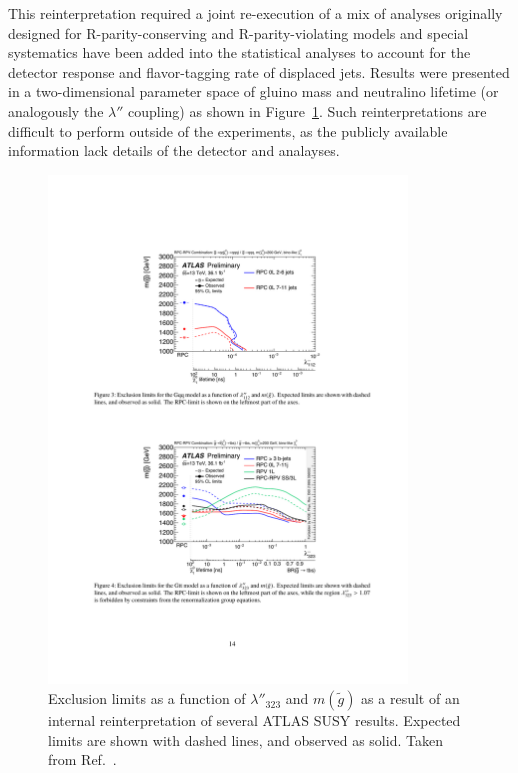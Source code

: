 This reinterpretation required a joint re-execution of a mix of analyses originally designed for R-parity-conserving and R-parity-violating models and special systematics have been added into the statistical analyses to account for the detector response and flavor-tagging rate of displaced jets. Results were presented in a two-dimensional parameter space of gluino mass and neutralino lifetime (or analogously the $\lambda''$ coupling) as shown in Figure~\ref{fig:rpvrpc}. Such reinterpretations are difficult to perform outside of the experiments, as the publicly available information lack details of the detector and analayses.

\begin{figure}[h]
\begin{center}
\includegraphics[width=0.85\textwidth,angle=0]{ch5-figures/fig_04.pdf}
\end{center}
\caption{Exclusion limits as a function of $\lambda''_{323}$ and $m({\tilde{g}})$ as a result of an internal reinterpretation of several ATLAS SUSY results. Expected limits are shown with dashed lines, and observed as solid. Taken from Ref.~\cite{ATLAS-CONF-2018-003}.}
\label{fig:rpvrpc}
\end{figure}

